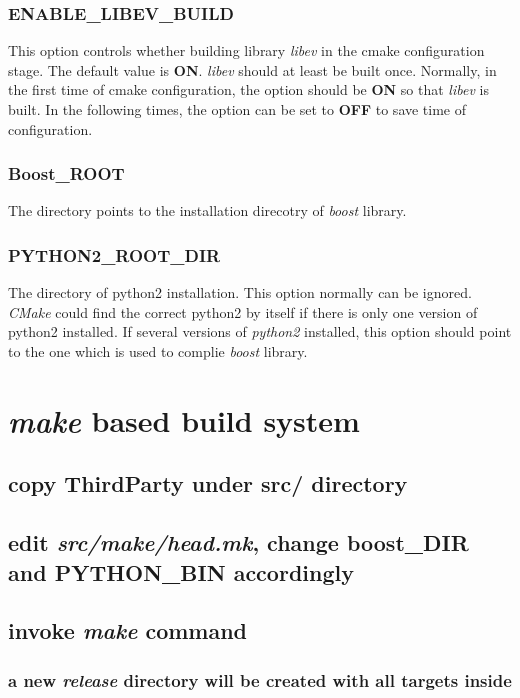 \documentclass[11pt]{article}
\begin{document}
\subsubsection{ENABLE\_LIBEV\_BUILD}
\label{sec:org30db51b}
This option controls whether building library \emph{libev} in the cmake configuration stage.
The default value is \textbf{ON}.
\emph{libev} should at least be built once.
Normally, in the first time of cmake configuration, the option should be \textbf{ON} so that \emph{libev} is built.
In the following times, the option can be set to \textbf{OFF} to save time of configuration.

\subsubsection{Boost\_ROOT}
\label{sec:org9405e74}
The directory points to the installation direcotry of \emph{boost} library.

\subsubsection{PYTHON2\_ROOT\_DIR}
\label{sec:org7e64e49}
The directory of python2 installation. This option normally can be ignored.
\emph{CMake} could find the correct python2 by itself if there is only one version of python2 installed.
If several versions of \emph{python2} installed, this option should point to the one which is used to complie \emph{boost} library.

\section{\emph{make} based build system}
\label{sec:orgdad9820}
\subsection{copy ThirdParty under src/ directory}
\label{sec:org991f5ea}
\subsection{edit \emph{src/make/head.mk}, change \textbf{boost\_DIR} and \textbf{PYTHON\_BIN} accordingly}
\label{sec:orge2d9e4b}
\subsection{invoke \emph{make} command}
\label{sec:org064d164}
\subsubsection{a new \emph{release} directory will be created with all targets inside}
\label{sec:org1f262cc}
\end{document}
